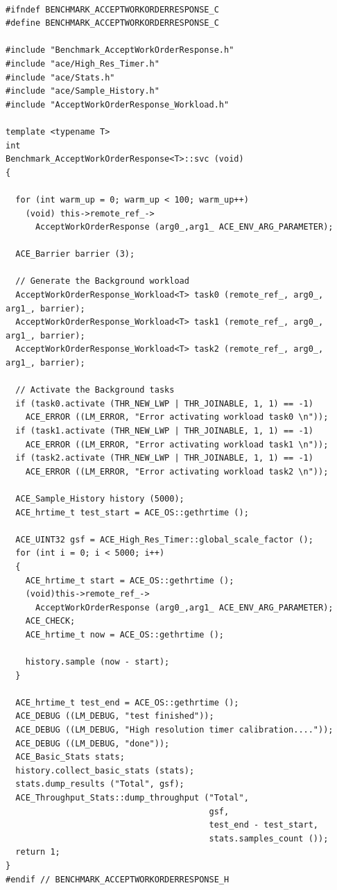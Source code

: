 \documentclass[onecolumn]{article}
\begin{document}
{
\footnotesize
\begin{verbatim}

#ifndef BENCHMARK_ACCEPTWORKORDERRESPONSE_C
#define BENCHMARK_ACCEPTWORKORDERRESPONSE_C

#include "Benchmark_AcceptWorkOrderResponse.h"
#include "ace/High_Res_Timer.h"
#include "ace/Stats.h"
#include "ace/Sample_History.h"
#include "AcceptWorkOrderResponse_Workload.h"

template <typename T>
int
Benchmark_AcceptWorkOrderResponse<T>::svc (void)
{

  for (int warm_up = 0; warm_up < 100; warm_up++)
    (void) this->remote_ref_->
      AcceptWorkOrderResponse (arg0_,arg1_ ACE_ENV_ARG_PARAMETER);

  ACE_Barrier barrier (3);

  // Generate the Background workload
  AcceptWorkOrderResponse_Workload<T> task0 (remote_ref_, arg0_, arg1_, barrier);
  AcceptWorkOrderResponse_Workload<T> task1 (remote_ref_, arg0_, arg1_, barrier);
  AcceptWorkOrderResponse_Workload<T> task2 (remote_ref_, arg0_, arg1_, barrier);

  // Activate the Background tasks
  if (task0.activate (THR_NEW_LWP | THR_JOINABLE, 1, 1) == -1)
    ACE_ERROR ((LM_ERROR, "Error activating workload task0 \n"));
  if (task1.activate (THR_NEW_LWP | THR_JOINABLE, 1, 1) == -1)
    ACE_ERROR ((LM_ERROR, "Error activating workload task1 \n"));
  if (task2.activate (THR_NEW_LWP | THR_JOINABLE, 1, 1) == -1)
    ACE_ERROR ((LM_ERROR, "Error activating workload task2 \n"));

  ACE_Sample_History history (5000);
  ACE_hrtime_t test_start = ACE_OS::gethrtime ();

  ACE_UINT32 gsf = ACE_High_Res_Timer::global_scale_factor ();
  for (int i = 0; i < 5000; i++)
  {
    ACE_hrtime_t start = ACE_OS::gethrtime ();
    (void)this->remote_ref_->
      AcceptWorkOrderResponse (arg0_,arg1_ ACE_ENV_ARG_PARAMETER);
    ACE_CHECK;
    ACE_hrtime_t now = ACE_OS::gethrtime ();

    history.sample (now - start);
  }

  ACE_hrtime_t test_end = ACE_OS::gethrtime ();
  ACE_DEBUG ((LM_DEBUG, "test finished"));
  ACE_DEBUG ((LM_DEBUG, "High resolution timer calibration...."));
  ACE_DEBUG ((LM_DEBUG, "done"));
  ACE_Basic_Stats stats;
  history.collect_basic_stats (stats);
  stats.dump_results ("Total", gsf);
  ACE_Throughput_Stats::dump_throughput ("Total",
                                         gsf,
                                         test_end - test_start,
                                         stats.samples_count ());
  return 1;
}
#endif // BENCHMARK_ACCEPTWORKORDERRESPONSE_H

\end{verbatim}
}
\end{document}
